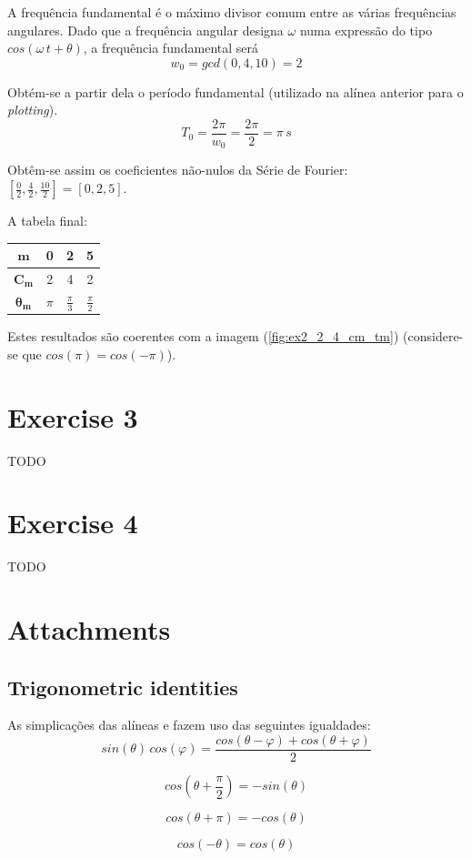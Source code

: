 \documentclass[a4paper]{article}
\begin{document}
\noindent A frequência fundamental é o máximo divisor comum entre as várias frequências angulares. Dado que a frequência angular designa $\omega$ numa expressão do tipo $cos(\omega \, t + \theta)$, a frequência fundamental será
\begin{equation}
	w_0 = gcd(0, 4, 10) = 2
\end{equation}

\noindent Obtém-se a partir dela o período fundamental (utilizado na alínea anterior para o \emph{plotting}).
\begin{equation}
	T_0 = \frac{2 \pi}{w_0} = \frac{2 \pi}{2} = \pi \, s
\end{equation}

\noindent Obtêm-se assim os coeficientes não-nulos da Série de Fourier: $\left[\frac{0}{2}, \frac{4}{2}, \frac{10}{2}\right] = [0, 2, 5]$.

\noindent A tabela final:

\begin{center}
	\begin{tabular}{|c|c|c|c|}
		\hline
		$\mathbf{m}$ & 0 & 2 & 5 \\
		\hline
		$\mathbf{C_m}$ & 2 & 4 & 2 \\
		\hline
		$\mathbf{\theta_m}$ & $\pi$ & $\frac{\pi}{3}$ & $\frac{\pi}{2}$ \\
		\hline
	\end{tabular}
	\label{tab:ex_2_1_3}
\end{center}

\noindent Estes resultados são coerentes com a imagem (\ref{fig:ex2_2_4_cm_tm}) (considere-se que $cos(\pi) = cos(-\pi)$).

\section{Exercise 3}
\noindent TODO %

\section{Exercise 4}
\noindent TODO %

\section{Attachments}
\subsection{Trigonometric identities}
\label{subsec:trigident}
As simplicações das alíneas \emph{} e \emph{} fazem uso das seguintes igualdades:
\begin{equation}
sin(\theta) \, cos(\varphi) = \frac{cos(\theta - \varphi) + cos(\theta + \varphi)}{2}
\end{equation}

\begin{equation}
cos\left(\theta + \frac{\pi}{2}\right) = -sin(\theta)
\end{equation}

\begin{equation}
cos(\theta + \pi) = -cos(\theta)
\end{equation}

\begin{equation}
cos(-\theta) = cos(\theta)
\end{equation}
\end{document}
